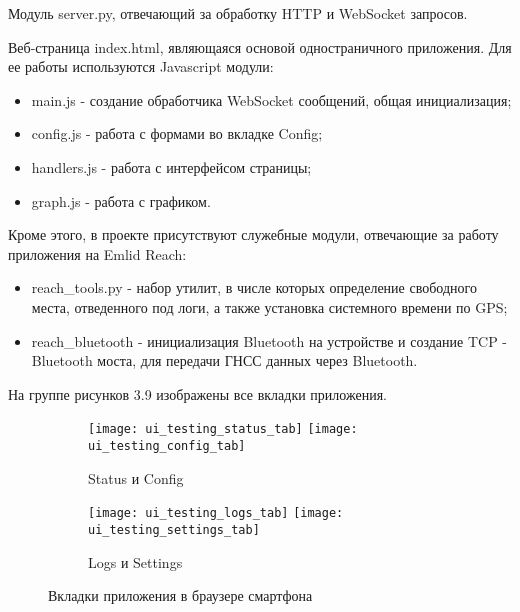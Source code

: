 Модуль server.py, отвечающий за обработку HTTP и WebSocket запросов.

Веб-страница index.html, являющаяся основой одностраничного приложения. Для ее работы используются Javascript модули:

\begin{itemize}
  \item main.js - создание обработчика WebSocket сообщений, общая инициализация;
  \item config.js - работа с формами во вкладке Config;
  \item handlers.js - работа с интерфейсом страницы;
  \item graph.js - работа с графиком.
\end{itemize}

Кроме этого, в проекте присутствуют служебные модули, отвечающие за работу приложения на Emlid Reach:

\begin{itemize}
  \item reach\_tools.py - набор утилит, в числе которых определение свободного места, отведенного под логи, а также установка системного времени по GPS;
  \item reach\_bluetooth - инициализация Bluetooth на устройстве и создание TCP - Bluetooth моста, для передачи ГНСС данных через Bluetooth.
\end{itemize}

На группе рисунков 3.9 изображены все вкладки приложения.

\begin{figure}
  \label{img:latex}
  \begin{subfigure}{\linewidth}
    \center
    \texttt{[image: ui\_testing\_status\_tab]}
    \texttt{[image: ui\_testing\_config\_tab]}
    \caption{Status и Config}
  \end{subfigure}\par\medskip
  \begin{subfigure}{\linewidth}
    \center
    \texttt{[image: ui\_testing\_logs\_tab]}
    \texttt{[image: ui\_testing\_settings\_tab]}
    \caption{Logs и Settings}
  \end{subfigure}\par\medskip
  \caption{Вкладки приложения в браузере смартфона}
\end{figure}